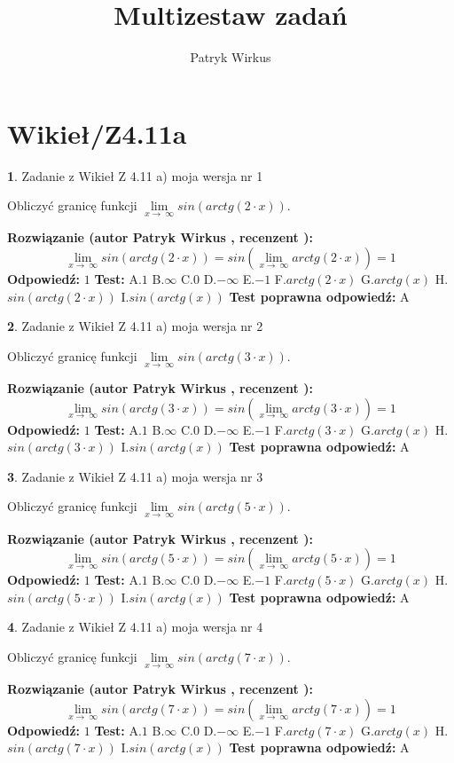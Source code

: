 \documentclass[12pt, a4paper]{article}
\title{Multizestaw zadań}
\author{Patryk Wirkus}
\date{}
\theoremstyle{definition} %
\newtheorem{zad}{}
\newcommand{\kategoria}[1]{\section{#1}}
\newcommand{\zadStart}[1]{\begin{zad}#1\newline}
\newcommand{\zadStop}{\end{zad}}
\newcommand{\rozwStart}[2]{\noindent \textbf{Rozwiązanie (autor #1 , recenzent #2): }\newline}
\newcommand{\rozwStop}{\newline}
\newcommand{\odpStart}{\noindent \textbf{Odpowiedź:}\newline}
\newcommand{\odpStop}{\newline}
\newcommand{\testStart}{\noindent \textbf{Test:}\newline}
\newcommand{\testStop}{\newline}
\newcommand{\kluczStart}{\noindent \textbf{Test poprawna odpowiedź:}\newline}
\newcommand{\kluczStop}{\newline}
\begin{document}
\maketitle

\kategoria{Wikieł/Z4.11a}


\zadStart{Zadanie z Wikieł Z 4.11 a) moja wersja nr 1}

Obliczyć granicę funkcji  $\lim\limits_{x\to\ \infty}sin(arctg(2\cdot x))$.
\zadStop
\rozwStart{Patryk Wirkus}{}
$$\lim\limits_{x\to\ \infty}sin(arctg(2\cdot x)) = sin(\lim\limits_{x\to\ \infty}arctg(2\cdot x)) = 1$$
\rozwStop
\odpStart
$1$
\odpStop
\testStart
A.$1$ B.$\infty$ C.$0$ D.$-\infty$ E.$-1$
F.$arctg(2\cdot x)$ G.$arctg(x)$
H.$sin(arctg(2\cdot x))$
I.$sin(arctg(x))$
\testStop
\kluczStart
A
\kluczStop



\zadStart{Zadanie z Wikieł Z 4.11 a) moja wersja nr 2}

Obliczyć granicę funkcji  $\lim\limits_{x\to\ \infty}sin(arctg(3\cdot x))$.
\zadStop
\rozwStart{Patryk Wirkus}{}
$$\lim\limits_{x\to\ \infty}sin(arctg(3\cdot x)) = sin(\lim\limits_{x\to\ \infty}arctg(3\cdot x)) = 1$$
\rozwStop
\odpStart
$1$
\odpStop
\testStart
A.$1$ B.$\infty$ C.$0$ D.$-\infty$ E.$-1$
F.$arctg(3\cdot x)$ G.$arctg(x)$
H.$sin(arctg(3\cdot x))$
I.$sin(arctg(x))$
\testStop
\kluczStart
A
\kluczStop



\zadStart{Zadanie z Wikieł Z 4.11 a) moja wersja nr 3}

Obliczyć granicę funkcji  $\lim\limits_{x\to\ \infty}sin(arctg(5\cdot x))$.
\zadStop
\rozwStart{Patryk Wirkus}{}
$$\lim\limits_{x\to\ \infty}sin(arctg(5\cdot x)) = sin(\lim\limits_{x\to\ \infty}arctg(5\cdot x)) = 1$$
\rozwStop
\odpStart
$1$
\odpStop
\testStart
A.$1$ B.$\infty$ C.$0$ D.$-\infty$ E.$-1$
F.$arctg(5\cdot x)$ G.$arctg(x)$
H.$sin(arctg(5\cdot x))$
I.$sin(arctg(x))$
\testStop
\kluczStart
A
\kluczStop



\zadStart{Zadanie z Wikieł Z 4.11 a) moja wersja nr 4}

Obliczyć granicę funkcji  $\lim\limits_{x\to\ \infty}sin(arctg(7\cdot x))$.
\zadStop
\rozwStart{Patryk Wirkus}{}
$$\lim\limits_{x\to\ \infty}sin(arctg(7\cdot x)) = sin(\lim\limits_{x\to\ \infty}arctg(7\cdot x)) = 1$$
\rozwStop
\odpStart
$1$
\odpStop
\testStart
A.$1$ B.$\infty$ C.$0$ D.$-\infty$ E.$-1$
F.$arctg(7\cdot x)$ G.$arctg(x)$
H.$sin(arctg(7\cdot x))$
I.$sin(arctg(x))$
\testStop
\kluczStart
A
\kluczStop
\end{document}
